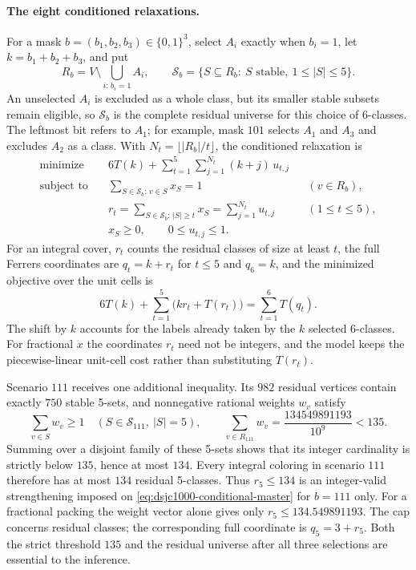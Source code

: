 \documentclass[11pt]{article}
\theoremstyle{definition}
\newcommand{\Stable}{\mathcal{S}}
\begin{document}
\paragraph{The eight conditioned relaxations.} For a mask
$b=(b_1,b_2,b_3)\in\{0,1\}^3$, select $A_i$ exactly when $b_i=1$, let
$k=b_1+b_2+b_3$, and put
\[
 R_b=V\setminus\bigcup_{i:\,b_i=1}A_i,\qquad
 \Stable_b=\{S\subseteq R_b:\ S\text{ stable},\ 1\le|S|\le5\}.
\]
An unselected $A_i$ is excluded as a whole class, but its smaller stable
subsets remain eligible, so $\Stable_b$ is the complete residual universe for
this choice of 6-classes. The leftmost bit refers to $A_1$; for example, mask
$101$ selects $A_1$ and $A_3$ and excludes $A_2$ as a class. With
$N_t=\lfloor|R_b|/t\rfloor$, the conditioned relaxation is
\begin{equation}
\begin{aligned}
 \text{minimize}\quad &6T(k)+\sum_{t=1}^{5}\sum_{j=1}^{N_t}(k+j)\,u_{t,j}\\
 \text{subject to}\quad
 &\sum_{S\in\Stable_b:\,v\in S}x_S=1 &&(v\in R_b),\\
 &r_t=\sum_{S\in\Stable_b:\,|S|\ge t}x_S=\sum_{j=1}^{N_t}u_{t,j} &&(1\le t\le5),\\
 &x_S\ge0,\qquad 0\le u_{t,j}\le1.
\end{aligned}
\label{eq:dsjc1000-conditional-master}
\end{equation}
For an integral cover, $r_t$ counts the residual classes of size at least
$t$, the full Ferrers coordinates are $q_t=k+r_t$ for $t\le5$ and $q_6=k$,
and the minimized objective over the unit cells is
\[
 6T(k)+\sum_{t=1}^{5}\bigl(kr_t+T(r_t)\bigr)=\sum_{t=1}^{6}T(q_t).
\]
The shift by $k$ accounts for the labels already taken by the $k$ selected
6-classes. For fractional $x$ the coordinates $r_t$ need not be integers,
and the model keeps the piecewise-linear unit-cell cost rather than
substituting $T(r_t)$.

Scenario $111$ receives one additional inequality. Its $982$ residual
vertices contain exactly $750$ stable 5-sets, and nonnegative rational
weights $w_v$ satisfy
\[
 \sum_{v\in S}w_v\ge1\quad(S\in\Stable_{111},\ |S|=5),
 \qquad
 \sum_{v\in R_{111}}w_v=\frac{134549891193}{10^9}<135.
\]
Summing over a disjoint family of these 5-sets shows that its integer
cardinality is strictly below $135$, hence at most $134$. Every integral
coloring in scenario $111$ therefore has at most $134$ residual 5-classes.
Thus $r_5\le134$ is an integer-valid strengthening imposed on
\eqref{eq:dsjc1000-conditional-master} for $b=111$ only. For a fractional
packing the weight vector alone gives only $r_5\le134.549891193$. The cap
concerns residual
classes; the corresponding full coordinate is $q_5=3+r_5$. Both the strict
threshold $135$ and the residual universe after all three selections are
essential to the inference.
\end{document}
